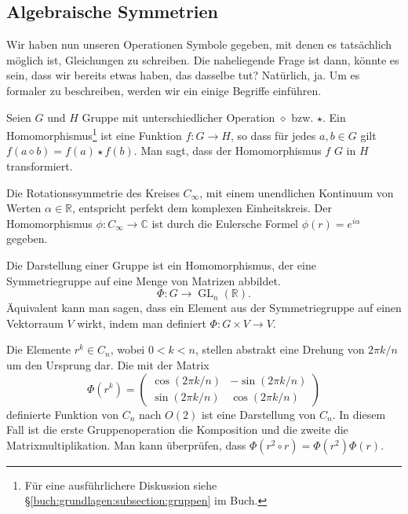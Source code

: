 \subsection{Algebraische Symmetrien}
Wir haben nun unseren Operationen Symbole gegeben, mit denen es tatsächlich
möglich ist, Gleichungen zu schreiben. Die naheliegende Frage ist dann, könnte
es sein, dass wir bereits etwas haben, das dasselbe tut?  Natürlich, ja.
Um es formaler zu beschreiben, werden wir ein einige Begriffe einführen.
\begin{definition}[Gruppenhomomorphismus]
	Seien \(G\) und \(H\) Gruppe mit unterschiedlicher Operation \(\diamond\)
	bzw.  \(\star\). Ein Homomorphismus\footnote{ Für eine ausführlichere
	Diskussion siehe \S\ref{buch:grundlagen:subsection:gruppen} im Buch.} ist
	eine Funktion \(f: G \to H\), so dass für jedes \(a, b \in G\) gilt
	\(f(a\diamond b) = f(a) \star f(b)\).  Man sagt, dass der Homomorphismus
	\(f\) \(G\) in \(H\) transformiert.
\end{definition}
\begin{beispiel}
	Die Rotationssymmetrie des Kreises \(C_\infty\), mit einem unendlichen
	Kontinuum von Werten \(\alpha \in \mathbb{R}\), entspricht perfekt dem
	komplexen Einheitskreis. Der Homomorphismus \(\phi: C_\infty \to \mathbb{C}\)
	ist durch die Eulersche Formel \(\phi(r) = e^{i\alpha}\) gegeben.
\end{beispiel}

\begin{definition}
	Die Darstellung einer Gruppe ist ein Homomorphismus, der eine Symmetriegruppe
	auf eine Menge von Matrizen abbildet.
	\[
		\Phi: G \to \operatorname{GL}_n(\mathbb{R}).
	\]
	Äquivalent kann man sagen, dass ein Element aus der Symmetriegruppe auf einen
	Vektorraum \(V\) wirkt, indem man definiert \(\Phi : G \times V \to V\).
\end{definition}
\begin{beispiel}
	Die Elemente \(r^k \in C_n\), wobei \(0 < k < n\), stellen abstrakt eine
	Drehung von \(2\pi k/n\) um den Ursprung dar. Die mit der Matrix 
	\[
		\Phi(r^k) = \begin{pmatrix}
			\cos(2\pi k/n) & -\sin(2\pi k/n) \\
			\sin(2\pi k/n) &  \cos(2\pi k/n)
		\end{pmatrix}
	\]
	definierte Funktion von \(C_n\) nach \(O(2)\) ist eine Darstellung von
	\(C_n\). In diesem Fall ist die erste Gruppenoperation die Komposition und
	die zweite die Matrixmultiplikation. Man kann überprüfen, dass \(\Phi(r^2
	\circ r) = \Phi(r^2)\Phi(r)\).
\end{beispiel}

